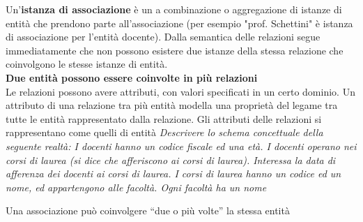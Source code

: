 \documentclass[a4paper,12pt, oneside]{book}
\begin{document}
Un'\textbf{istanza di associazione} è un a combinazione o aggregazione di istanze di entità che prendono parte all'associazione (per esempio "prof. Schettini" è istanza di associazione per l'entità docente). Dalla semantica delle relazioni segue immediatamente che non possono esistere due istanze della stessa relazione che coinvolgono le stesse istanze di entità.\\
\textbf{Due entità possono essere coinvolte in più relazioni}
\\
Le relazioni possono avere attributi, con valori specificati in un certo dominio. Un attributo di una relazione tra più entità modella una proprietà del legame tra tutte le entità rappresentato dalla relazione. Gli attributi delle relazioni si rappresentano come quelli di entità
\newpage
\textit{Descrivere lo schema concettuale della seguente
realtà:
I docenti hanno un codice fiscale ed una età. I
docenti operano nei corsi di laurea (si dice che
afferiscono ai corsi di laurea). Interessa la data di
afferenza dei docenti ai corsi di laurea. I corsi di
laurea hanno un codice ed un nome, ed
appartengono alle facoltà. Ogni facoltà ha un nome}
\begin{center}
\end{center}
\newpage
Una associazione può coinvolgere “due o più volte”
la stessa entità
\end{document}
